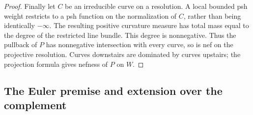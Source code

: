 \begin{proof}
Finally let $C$ be an irreducible curve on a resolution. A local bounded psh weight restricts to a psh function on the normalization of $C$, rather than being identically $-\infty$. The resulting positive curvature measure has total mass equal to the degree of the restricted line bundle. This degree is nonnegative. Thus the pullback of $P$ has nonnegative intersection with every curve, so is nef on the projective resolution. Curves downstairs are dominated by curves upstairs; the projection formula gives nefness of $P$ on $W$.
\end{proof}

\subsection{The Euler premise and extension over the complement}\label{subsec:extension}

